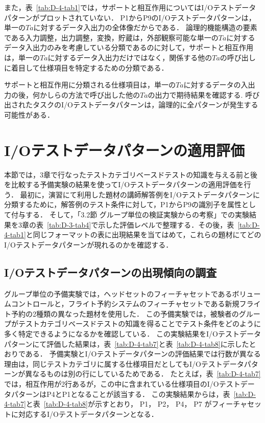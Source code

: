 また，表~\ref{tab:D-4-tab1}では，サポートと相互作用についてはI/Oテストデータパターンがプロットされていない．
P1からP9のI/Oテストデータパターンは，単一の$Ta$に対するデータ入出力の全体像だからである．
論理的機能構造の要素である入力調整，出力調整，変換，貯蔵は，外部観察可能な単一の$Ta$に対するデータ入出力のみを考慮している分類であるのに対して，サポートと相互作用は，単一の$Ta$に対するデータ入出力だけではなく，関係する他の$Ta$の呼び出しに着目して仕様項目を特定するための分類である．

サポートと相互作用に分類される仕様項目は，単一の$Ta$に対するデータの入出力の後，何かしらの方法で呼び出した他の$Ta$の出力で期待結果を確認する.
呼び出されたタスクのI/Oテストデータパターンは，論理的に全パターンが発生する可能性がある．


\newpage
\section{I/Oテストデータパターンの適用評価}
本節では，3章で行なったテストカテゴリベースドテストの知識を与える前と後を比較する予備実験の結果を使ってI/Oテストデータパターンの適用評価を行う．
最初に，演習にて利用した題材の講師解答例をI/Oテストデータパターンに分類するために，解答例のテスト条件に対して，P1からP9の識別子を属性として付与する．
そして，「3.2節 グループ単位の検証実験からの考察」での実験結果を3章の表~\ref{tab:D-3-tab4}で示した評価レベルで整理する．その後，表~\ref{tab:D-4-tab1}と同じフォーマットの表に出現結果を当てはめて，これらの題材にてどのI/Oテストデータパターンが現れるのかを確認する．

\subsection{I/Oテストデータパターンの出現傾向の調査}
グループ単位の予備実験では，ヘッドセットのフィーチャセットであるボリュームコントロールと，フライト予約システムのフィーチャセットである新規フライト予約の2種類の異なった題材を使用した．
この予備実験では，被験者のグループがテストカテゴリベースドテストの知識を得ることでテスト条件をどのように多く特定できるようになるかを確認している．
この実験結果をI/Oテストデータパターンにて評価した結果は，表~\ref{tab:D-4-tab7}と表~\ref{tab:D-4-tab8}に示したとおりである．
予備実験とI/Oテストデータパターンの評価結果では行数が異なる理由は，同じテストカテゴリに属する仕様項目だとしてもI/Oテストデータパターンが異なるものは別の行にしているためである．
たとえば，表~\ref{tab:D-4-tab7}では，相互作用が2行あるが，この中に含まれている仕様項目のI/OテストデータパターンはP4とP1となることが該当する．
この実験結果からは，表~\ref{tab:D-4-tab7}と表~\ref{tab:D-4-tab8}が示すとおり， P1， P2， P4， P7 がフィーチャセットに対応するI/Oテストデータパターンとなる．

